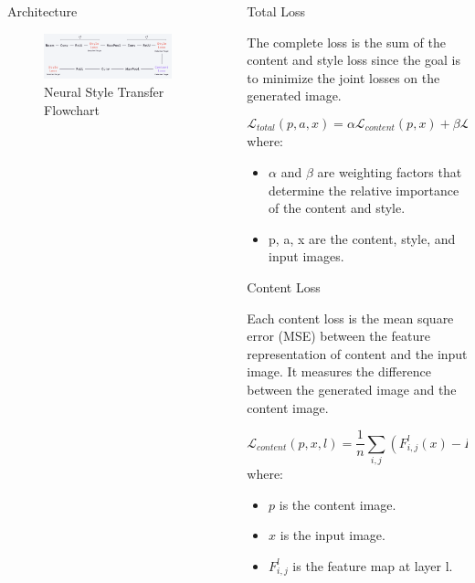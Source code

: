 \documentclass[final]{beamer}
\newlength{\sepwidth}
\newlength{\colwidth}
\newcommand{\separatorcolumn}{\begin{column}{\sepwidth}\end{column}}
\begin{document}
\begin{frame}[t]
\begin{columns}[t]
\begin{column}{\colwidth}
\begin{block}{Architecture}
        \begin{figure}
          \centering
            \includegraphics[width=1\textwidth]{figures/NST Flowchart.png}
        
            \caption{Neural Style Transfer Flowchart}
        \end{figure}
    
    \end{block}

\end{column}

\separatorcolumn

\begin{column}{\colwidth}

  \begin{block}{Total Loss}

    The complete loss is the sum of the content and style loss since the goal is to minimize the joint losses on the generated image.

    $$
    \mathcal{L}_{total}(p, a, x) = \alpha\mathcal{L}_{content}(p, x) + \beta\mathcal{L}_{style}(a, x)
    $$
    where:
    \begin{itemize}
        \item $\alpha$ and $\beta$ are weighting factors that determine the relative importance of the content and style.
        \item p, a, x are the content, style, and input images.
    \end{itemize}

  \end{block}

  \begin{block}{Content Loss}

    Each content loss is the mean square error (MSE) between the feature representation of content and the input image. It measures the difference between the generated image and the content image.

    $$\mathcal{L}_{content}(p, x, l) = \frac{1}{n} \sum_{i, j}(F^l_{i, j}(x) - F^l_{i, j}(p))^2$$
    where:
    \begin{itemize}
        \item $p$ is the content image.
        \item $x$ is the input image.
        \item $F^l_{i, j}$ is the feature map at layer l.
    \end{itemize}


\end{block}
\end{column}
\end{columns}
\end{frame}
\end{document}
